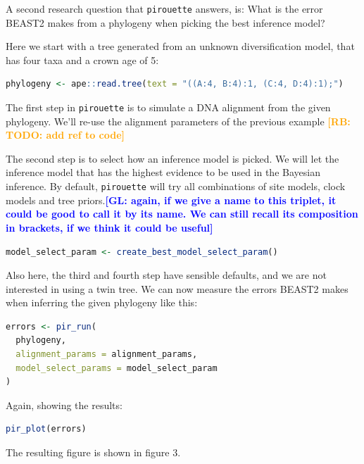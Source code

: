 \documentclass{article}
\newcommand{\giovanni}[1]{\textcolor{blue}{\textbf{[GL: #1]}}}
\newcommand{\richel}[1]{\textcolor{orange}{\textbf{[RB: #1]}}}
\begin{document}
A second research question that \verb;pirouette; answers, is:
What is the error BEAST2 makes from a phylogeny when
picking the best inference model?

Here we start with a tree generated from an unknown 
diversification model, that has four taxa and a crown age of 5:

\begin{lstlisting}[language=R, floatplacement=H, frame=single]
phylogeny <- ape::read.tree(text = "((A:4, B:4):1, (C:4, D:4):1);")
\end{lstlisting}

The first step in \verb;pirouette; is to simulate a DNA alignment from the 
given phylogeny. We'll re-use the alignment parameters of the previous example 
\richel{TODO: add ref to code}
 
The second step is to select how an inference model is picked.
We will let the inference model that has the highest evidence to be used
in the Bayesian inference. By default, \verb;pirouette; will try
all combinations of site models, clock models and tree priors.\giovanni{again, if we give a name to this triplet, it could be good to call it by its name. We can still recall its composition in brackets, if we think it could be useful}

\begin{lstlisting}[language=R, floatplacement=H, frame=single]
model_select_param <- create_best_model_select_param()
\end{lstlisting}

Also here, the third and fourth step have sensible defaults, and we are not
interested in using a twin tree. We can now measure the errors BEAST2
makes when inferring the given phylogeny like this:

\begin{lstlisting}[language=R, floatplacement=H, frame=single]
errors <- pir_run(
  phylogeny,
  alignment_params = alignment_params,
  model_select_params = model_select_param
)
\end{lstlisting}

Again, showing the results:

\begin{lstlisting}[language=R, floatplacement=H, frame=single]
pir_plot(errors)
\end{lstlisting}

The resulting figure is shown in figure 3.
\end{document}
